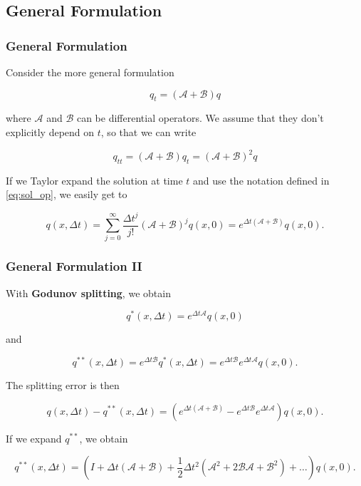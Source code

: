 \documentclass{beamer}
\newcommand{\ca}{\mathcal{A}}
\newcommand{\cb}{\mathcal{B}}
\renewcommand{\d}{\Delta}
\newcommand{\emp}[1]{\textcolor{tum}{\textbf{#1}}}
\begin{document}
\subsection{General Formulation}
\begin{frame}
	\frametitle{General Formulation}
	Consider the more general formulation

	\begin{equation}
		q_t = (\ca+\cb)q
	\end{equation}

	where $\ca$ and $\cb$ can be differential operators. We assume that they don't explicitly depend on $t$, so that we can write

	\begin{equation}
		q_{tt} = (\ca+\cb)q_t=(\ca+\cb)^2q
	\end{equation}

	If we Taylor expand the solution at time $t$ and use the notation defined in \eqref{eq:sol_op}, we easily get to

	\begin{equation}\label{eq:exp_unsplit}
		q(x,\d t) = \sum_{j=0}^{\infty}\frac{\d t^j}{j!}(\ca + \cb)^jq(x,0) = e^{\d t(\ca +\cb)}q(x,0).
	\end{equation}


\end{frame}

\begin{frame}
	\frametitle{General Formulation II}
	With \emp{Godunov splitting}, we obtain

	\begin{equation}
		q^*(x,\d t)=e^{\d t \ca}q(x,0)
	\end{equation}

	and

	\begin{equation}
		q^{**}(x,\d t)=e^{\d t \cb}q^*(x,\d t) = e^{\d t \cb}e^{\d t \ca}q(x,0).
	\end{equation}

	The splitting error is then

	\begin{equation}
		q(x,\d t)-q^{**}(x,\d t) = (e^{\d t(\ca +\cb)}-e^{\d t \cb}e^{\d t \ca})q(x,0).
	\end{equation}

	If we expand $q^{**}$, we obtain

	\begin{equation}\label{eq:exp_split}
		q^{**}(x,\d t) = (I+\d t(\ca + \cb)+\frac{1}{2}\d t^2(\ca^2+2\cb\ca+\cb^2)+\dots)q(x,0).
	\end{equation}

\end{frame}
\end{document}
